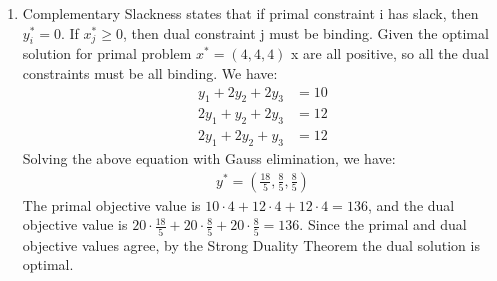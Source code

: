\documentclass[12pt]{article}
\begin{document}
\begin{enumerate}[label= (\alph*), leftmargin=2em]
\item Complementary Slackness states that if primal constraint i has slack, then $y_i^* = 0$. If $x_j^* \geq 0$, then dual constraint j must be binding. Given the optimal solution for primal problem $x^* = (4, 4, 4)$ x are all positive, so all the dual constraints must be all binding. We have:
\begin{align*}
y_1 + 2y_2 + 2y_3 &= 10 \\
2y_1 + y_2 + 2y_3 &= 12 \\
2y_1 + 2y_2 + y_3 &= 12
\end{align*}
Solving the above equation with Gauss elimination, we have:
\begin{align*}
y^* = \left(\frac{18}{5}, \frac{8}{5}, \frac{8}{5}\right)
\end{align*}
The primal objective value is $10\cdot4 + 12\cdot4 + 12\cdot4 = 136$, and the dual objective value is $20 \cdot \frac{18}{5} + 20 \cdot \frac{8}{5} + 20 \cdot \frac{8}{5} = 136$. Since the primal and dual objective values agree, by the Strong Duality Theorem the dual solution is optimal.
\end{enumerate}
\end{document}
